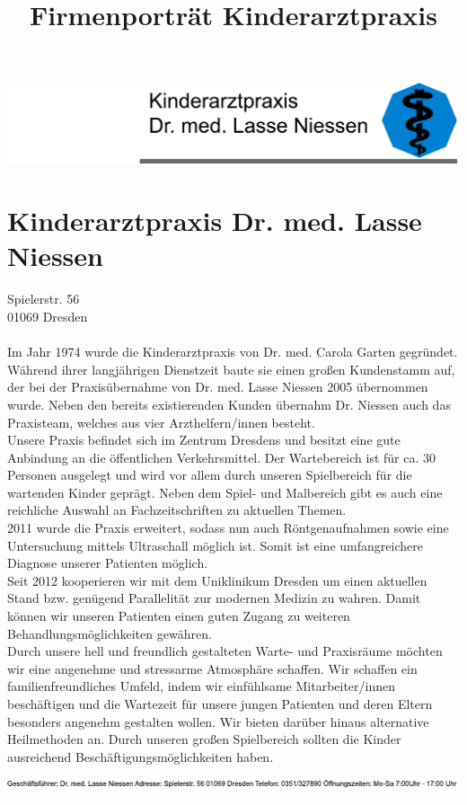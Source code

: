 \documentclass[11pt]{article}
\title{Firmenporträt Kinderarztpraxis}
\begin{document}
\includegraphics[scale=0.9]{banner.pdf}

\section*{Kinderarztpraxis Dr. med. Lasse Niessen}
Spielerstr. 56\\
01069 Dresden\\\\

Im Jahr 1974 wurde die Kinderarztpraxis von Dr. med. Carola Garten gegründet. Während ihrer langjährigen Dienstzeit baute sie einen großen Kundenstamm auf, der bei der Praxisübernahme von Dr. med. Lasse Niessen 2005 übernommen wurde. Neben den bereits existierenden Kunden übernahm Dr. Niessen auch das Praxisteam, welches aus vier Arzthelfern/innen besteht.\\

Unsere Praxis befindet sich im Zentrum Dresdens und besitzt eine gute Anbindung an die öffentlichen Verkehrsmittel. Der Wartebereich ist für ca. 30 Personen ausgelegt und wird vor allem durch unseren Spielbereich für die wartenden Kinder geprägt. Neben dem Spiel- und Malbereich gibt es auch eine reichliche Auswahl an Fachzeitschriften zu aktuellen Themen.\\

2011 wurde die Praxis erweitert, sodass nun auch Röntgenaufnahmen sowie eine Untersuchung mittels Ultraschall möglich ist. Somit ist eine umfangreichere Diagnose unserer Patienten möglich.\\

Seit 2012 kooperieren wir mit dem Uniklinikum Dresden um einen aktuellen Stand bzw. genügend Parallelität zur modernen Medizin zu wahren. Damit können wir unseren Patienten einen guten Zugang zu weiteren Behandlungsmöglichkeiten gewähren.\\

Durch unsere hell und freundlich gestalteten Warte- und Praxisräume möchten wir eine angenehme und stressarme Atmosphäre schaffen.
Wir schaffen ein familienfreundliches Umfeld, indem wir einfühlsame Mitarbeiter/innen beschäftigen und die Wartezeit für unsere jungen Patienten und deren Eltern besonders angenehm gestalten wollen. Wir bieten darüber hinaus alternative Heilmethoden an.
Durch unseren großen Spielbereich sollten die Kinder ausreichend Beschäftigungsmöglichkeiten haben.

\vspace*{\fill}
\includegraphics[scale=0.9]{footer.pdf}
\thispagestyle{empty}
\end{document}
